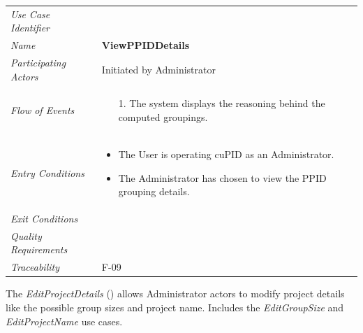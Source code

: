 \documentclass[12pt,letterpaper]{article}
\begin{document}
\begin{center}
	\begin{tabu} to 
		\toprule
		Use Case Identifier &  \\
		Name & {\bf ViewPPIDDetails} \\
		Participating Actors & Initiated by Administrator \\
		Flow of Events & 
		\begin{minipage}[t]{\linewidth}
		    \begin{enumerate}
		        \item[1.] The system displays the reasoning behind the computed groupings.
			\end{enumerate}
	    \end{minipage} \\

		Entry Conditions &
		\begin{minipage}[t]{\linewidth}
			\begin{itemize}
			    \item The User is operating cuPID as an Administrator.
			    \item The Administrator has chosen to view the PPID grouping details.
	        \end{itemize}
	    \end{minipage} \\

		Exit Conditions & \\

		Quality Requirements & \\

		Traceability & F-09 \\
		\toprule
	\end{tabu}
\end{center}

\newpage{}

The {\it EditProjectDetails} () allows Administrator actors to modify project details like the possible group sizes and project name. Includes the {\it EditGroupSize} and {\it EditProjectName} use cases.
\end{document}
